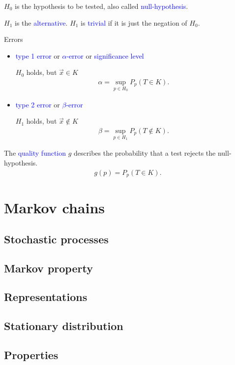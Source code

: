 \documentclass{beamer}
\def\padding{\vspace{0.5cm}}
\def\b{\textcolor{blue}}
\begin{document}
\begin{frame}
    $H_0$ is the hypothesis to be tested, also called \b{null-hypothesis}.\par
    $H_1$ is the \b{alternative}. $H_1$ is \b{trivial} if it is just the negation of $H_0$.\pause\par\padding
    \begin{block}{Errors}
        \begin{itemize}
            \item \b{type 1 error} or \b{$\alpha$-error} or \b{significance level}\par
                $H_0$ holds, but $\overrightarrow{x} \in K$
                \begin{align*}
                    \alpha = \sup_{p \in H_0} P_p(T \in K).
                \end{align*}\pause
            \item \b{type 2 error} or \b{$\beta$-error}\par
                $H_1$ holds, but $\overrightarrow{x} \not\in K$
                \begin{align*}
                    \beta = \sup_{p \in H_1} P_p(T \not\in K).
                \end{align*}
        \end{itemize}
    \end{block}
\end{frame}

\begin{frame}
    The \b{quality function} $g$ describes the probability that a test rejects the null-hypothesis.
    \begin{align*}
        g(p) = P_p(T \in K).
    \end{align*}
\end{frame}

\section{Markov chains}
\subsection{Stochastic processes}
\subsection{Markov property}
\subsection{Representations}
\subsection{Stationary distribution}
\subsection{Properties}
\end{document}
